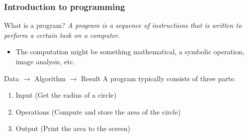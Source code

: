   \begin{frame}
  \frametitle{Introduction to programming}
  \begin{block}{What is a program?}
    \emph{A program is a sequence of instructions that is written to perform a certain task on a computer.} %
  \end{block}
  \begin{itemize}
    \item The computation might be something mathematical, a symbolic operation, image analysis, etc.
  \end{itemize}
  \begin{block}{Data $\rightarrow$ Algorithm $\rightarrow$ Result}
    A program typically consists of three parts:
  \begin{enumerate}
    \item Input (Get the radius of a circle)
    \item Operations (Compute and store the area of the circle)
    \item Output (Print the area to the screen)
  \end{enumerate}
\end{block}
\end{frame}


